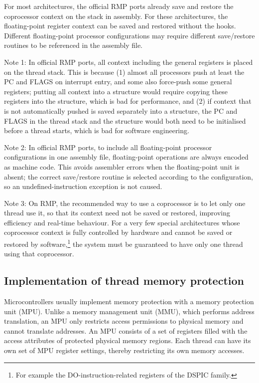 For most architectures, the official RMP ports already save and restore the coprocessor context on the stack in assembly.
For these architectures, the floating-point register context can be saved and restored without the hooks.
Different floating-point processor configurations may require different save/restore routines to be referenced in the assembly file.

Note 1: In official RMP ports, all context including the general registers is placed on the thread stack.
This is because (1) almost all processors push at least the PC and FLAGS on interrupt entry, and some also force-push some general registers; putting all context into a structure would require copying these registers into the structure, which is bad for performance, and (2) if context that is not automatically pushed is saved separately into a structure, the PC and FLAGS in the thread stack and the structure would both need to be initialised before a thread starts, which is bad for software engineering.

Note 2: In official RMP ports, to include all floating-point processor configurations in one assembly file, floating-point operations are always encoded as machine code.
This avoids assembler errors when the floating-point unit is absent; the correct save/restore routine is selected according to the configuration, so an undefined-instruction exception is not caused.

Note 3: On RMP, the recommended way to use a coprocessor is to let only one thread use it, so that its context need not be saved or restored, improving efficiency and real-time behaviour.
For a very few special architectures whose coprocessor context is fully controlled by hardware and cannot be saved or restored by software,\footnote{For example the DO-instruction-related registers of the DSPIC family.} the system must be guaranteed to have only one thread using that coprocessor.

\subsection{Implementation of thread memory protection}\label{sec:mpu}

Microcontrollers usually implement memory protection with a memory protection unit (MPU).
Unlike a memory management unit (MMU), which performs address translation, an MPU only restricts access permissions to physical memory and cannot translate addresses.
An MPU consists of a set of registers filled with the access attributes of protected physical memory regions.
Each thread can have its own set of MPU register settings, thereby restricting its own memory accesses.

